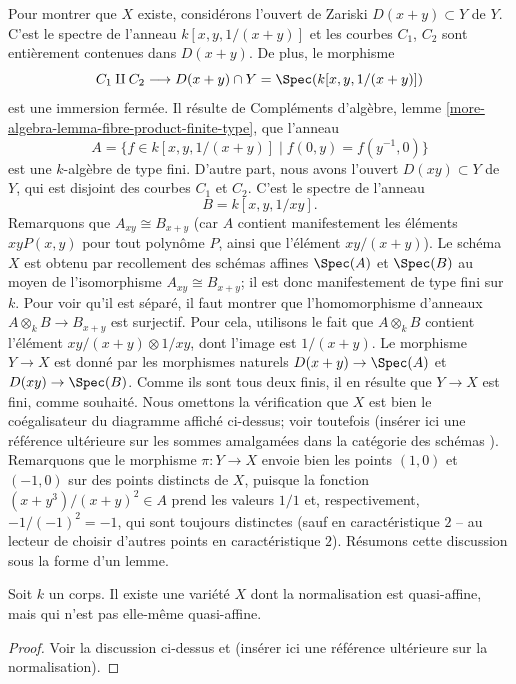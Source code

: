 \medskip\noindent
Pour montrer que $X$ existe, considérons l'ouvert de Zariski
$D(x + y) \subset Y$ de $Y$. C'est le spectre
de l'anneau
$k[x, y, 1/(x + y)]$
et les courbes $C_1$, $C_2$ sont entièrement contenues dans
$D(x + y)$. De plus, le morphisme
$$
C_1 \amalg C_2
\longrightarrow
D(x + y) \cap Y = \Spec(k[x, y, 1/(x + y)])
$$
est une immersion fermée. Il résulte de
Compléments d'algèbre, lemme \ref{more-algebra-lemma-fibre-product-finite-type},
que l'anneau
$$
A =
\{f \in k[x, y, 1/(x + y)] \mid f(0, y) = f(y^{-1}, 0)\}
$$
est une $k$-algèbre de type fini. D'autre part, nous avons l'ouvert
$D(xy) \subset Y$ de $Y$, qui est disjoint des courbes $C_1$
et $C_2$. C'est le spectre de l'anneau
$$
B = k[x, y, 1/xy].
$$
Remarquons que $A_{xy} \cong B_{x + y}$ (car $A$ contient manifestement
les éléments $xyP(x, y)$ pour tout polynôme $P$, ainsi que l'élément $xy/(x + y)$).
Le schéma $X$ est obtenu par recollement des schémas affines
$\Spec(A)$ et $\Spec(B)$ au moyen de l'isomorphisme
$A_{xy} \cong B_{x + y}$; il est donc manifestement de type fini sur
$k$. Pour voir qu'il est séparé, il faut montrer que
l'homomorphisme d'anneaux $A \otimes_k B \to B_{x + y}$ est surjectif. Pour cela,
utilisons le fait que $A \otimes_k B$ contient l'élément
$xy/(x + y) \otimes 1/xy$, dont l'image est $1/(x + y)$.
Le morphisme $Y \to X$ est donné par les morphismes naturels
$D(x + y) \to \Spec(A)$ et $D(xy) \to \Spec(B)$.
Comme ils sont tous deux finis, il en résulte que $Y \to X$ est fini,
comme souhaité. Nous omettons la vérification que $X$ est bien le
coégalisateur du diagramme affiché ci-dessus; voir toutefois
(insérer ici une référence ultérieure sur les sommes amalgamées dans la catégorie des schémas
). Remarquons que le morphisme $\pi : Y \to X$ envoie bien
les points $(1, 0)$
et $(-1, 0)$ sur des points distincts de $X$, puisque la
fonction $(x + y^3)/(x + y)^2 \in A$ prend les valeurs
$1/1$ et, respectivement,\ $-1/(-1)^2 = -1$, qui sont toujours distinctes
(sauf en caractéristique $2$ -- au lecteur de choisir d'autres points
en caractéristique $2$). Résumons cette discussion sous
la forme d'un lemme.

\begin{lemma}
\label{lemma-quasi-affine-normalization-not-quasi-affine}
Soit $k$ un corps.
Il existe une variété $X$ dont la normalisation est quasi-affine, mais
qui n'est pas elle-même quasi-affine.
\end{lemma}

\begin{proof}
Voir la discussion ci-dessus et (insérer ici une référence ultérieure sur la normalisation).
\end{proof}



